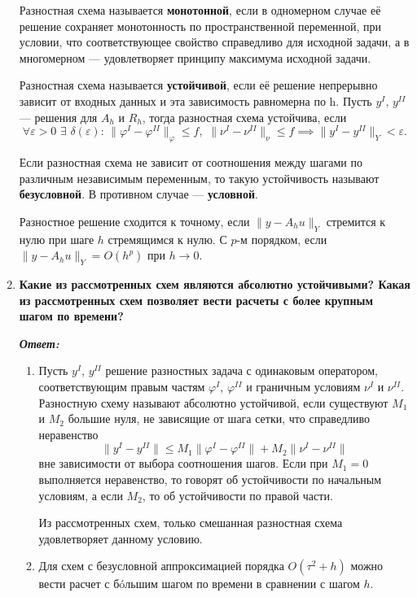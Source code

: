\documentclass[12pt, a4paper]{article}
\newcommand{\norm}[1]{\lVert #1 \rVert}
\begin{document}
\begin{enumerate}
		Разностная схема называется \textbf{монотонной}, если в одномерном случае её решение сохраняет монотонность по
		пространственной переменной, при условии, что соответствующее свойство справедливо для исходной задачи, а в
		многомерном — удовлетворяет принципу максимума исходной задачи.

		Разностная схема называется \textbf{устойчивой}, если её решение непрерывно зависит от входных данных и эта зависимость равномерна по h. Пусть $y^I, \, y^{II}$ --- решения для $A_h$ и $R_h$, тогда разностная схема устойчива, если
		\[
		\forall \varepsilon > 0 \,\, \exists \,\, \delta (\varepsilon): \, \norm{\varphi^I - \varphi^{II}}_\varphi \leq f, \,\, \norm{\nu^I - \nu^{II}}_\nu \leq f \implies \norm{y^I - y^{II}}_Y < \varepsilon.
		\]
		
		Если разностная схема не зависит от соотношения между шагами по различным независимым переменным, то такую устойчивость называют \textbf{безусловной}. В противном случае — \textbf{условной}.

		Разностное решение сходится к точному, если $\norm{y - A_h u}_Y$ стремится к нулю при шаге $h$ стремящимся к нулю. С $p$-м порядком, если $\norm{y - A_h u}_Y = O(h^p)$ при $h \to 0$.

		\item \textbf{Какие из рассмотренных схем являются абсолютно устойчивыми? Какая из рассмотренных схем позволяет вести расчеты с более крупным шагом по времени?}
		\vspace*{0.2cm}
		
		\textit{\textbf{Ответ:}}
		
		\begin{enumerate}
			\item Пусть $y^I$, $y^{II}$ решение разностных задача с одинаковым оператором, соответствующим правым частям $\varphi^I$, $\varphi^{II}$ и граничным условиям $\nu^{I}$ и $\nu^{II}$.  Разностную схему называют абсолютно устойчивой, если существуют $M_1$ и $M_2$ большие нуля, не зависящие от шага сетки, что справедливо неравенство
			\[
			\norm{y^I - y^{II}} \le M_1 \norm{\varphi^I - \varphi^{II}}  + M_2\norm{\nu^{I} - \nu^{II}}
			\]
			вне зависимости от выбора соотношения шагов. Если при $M_1 = 0$ выполняется неравенство, то говорят об устойчивости по начальным условиям, а если $M_2$, то об устойчивости по правой части.
			
			Из рассмотренных схем, только смешанная разностная схема удовлетворяет данному условию.
			
			\item Для схем с безусловной аппроксимацией порядка $O(\tau^2 + h)$ можно вести расчет с б\'oльшим шагом по времени в сравнении с шагом $h$.   
		\end{enumerate}
				

\end{enumerate}
\end{document}
